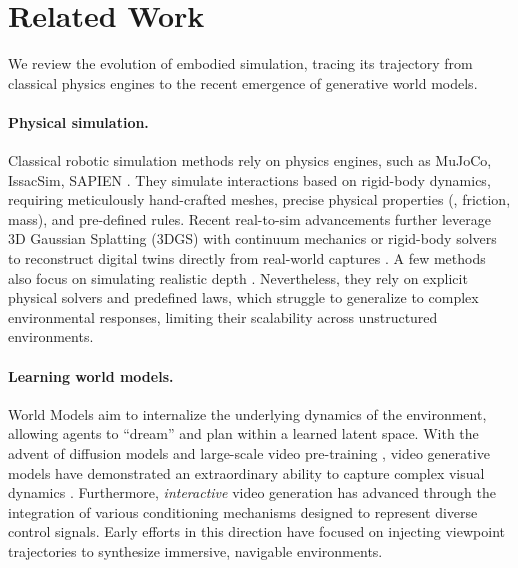\section{Related Work}
\label{sec:related_work}
We review the evolution of embodied simulation, tracing its trajectory from classical physics engines to the recent emergence of generative world models.

\paragraph{Physical simulation.}
Classical robotic simulation methods rely on physics engines, such as MuJoCo, IssacSim, SAPIEN \cite{todorov2012mujoco,erez2015simulation,xiang2020sapien,makoviychuk2021isaac,mittal2023orbit,robotwin}. They simulate interactions based on rigid-body dynamics, requiring meticulously hand-crafted meshes, precise physical properties (\eg, friction, mass), and pre-defined rules. 
Recent real-to-sim advancements further leverage 3D Gaussian Splatting (3DGS) with continuum mechanics or rigid-body solvers to reconstruct digital twins directly from real-world captures \cite{pashevich2019learning,li2024robogsim,abouchakra-embodiedgaussians,jiang2025gsworld,han2025re}. 
A few methods also focus on simulating realistic depth \cite{xu2025stable,liu2025manipulation}.
Nevertheless, they rely on explicit physical solvers and predefined laws, which struggle to generalize to complex environmental responses, limiting their scalability across unstructured environments.

\paragraph{Learning world models.}
World Models \cite{allen1983planning,ha2018world} aim to internalize the underlying dynamics of the environment, allowing agents to “dream” and plan within a learned latent space. With the advent of diffusion models \cite{song2019generative,ho2020denoising,dit} and large-scale video pre-training \cite{hong2022cogvideo,bruce2024genie,zhang2025show,wan2025wan}, video generative models have demonstrated an extraordinary ability to capture complex visual dynamics \cite{assran2025v,chefer2025videojam}. Furthermore, \textit{interactive} video generation has advanced through the integration of various conditioning mechanisms \cite{zhang2023adding} designed to represent diverse control signals. Early efforts in this direction have focused on injecting viewpoint trajectories \cite{yu2025wonderworld,liang2025wonderland,ren2025gen3c,gu2025diffusion,Yu_2025_ICCV} to synthesize immersive, navigable environments.

